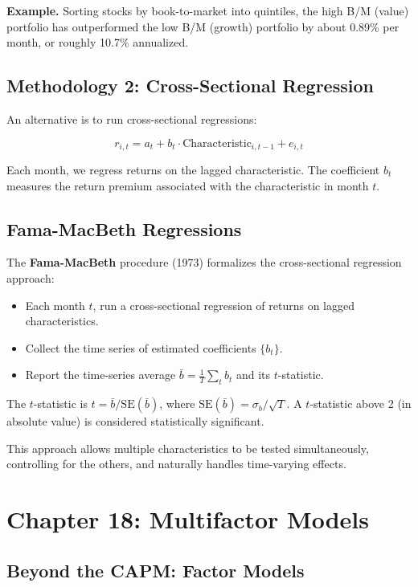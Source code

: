 \documentclass[11pt,letterpaper]{report}
\begin{document}
\textbf{Example.}  Sorting stocks by book-to-market into quintiles, the high B/M (value) portfolio has outperformed the low B/M (growth) portfolio by about 0.89\% per month, or roughly 10.7\% annualized.

\section{Methodology 2: Cross-Sectional Regression}


An alternative is to run cross-sectional regressions:

$$r_{i,t} = a_t + b_t \cdot \text{Characteristic}_{i,t-1} + e_{i,t}$$

Each month, we regress returns on the lagged characteristic.  The coefficient $b_t$ measures the return premium associated with the characteristic in month $t$.

\section{Fama-MacBeth Regressions}


The \textbf{Fama-MacBeth} procedure (1973) formalizes the cross-sectional regression approach:

\begin{itemize}
  \item Each month $t$, run a cross-sectional regression of returns on lagged characteristics.
  \item Collect the time series of estimated coefficients $\{b_t\}$.
  \item Report the time-series average $\bar{b} = \frac{1}{T}\sum_t b_t$ and its $t$-statistic.
\end{itemize}

The $t$-statistic is $t = \bar{b} / \text{SE}(\bar{b})$, where $\text{SE}(\bar{b}) = \sigma_b / \sqrt{T}$.  A $t$-statistic above 2 (in absolute value) is considered statistically significant.

This approach allows multiple characteristics to be tested simultaneously, controlling for the others, and naturally handles time-varying effects.


\chapter{Chapter 18: Multifactor Models}


\section{Beyond the CAPM: Factor Models}
\end{document}

